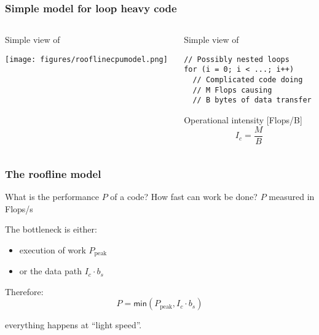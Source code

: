 \documentclass[dvipsnames,presentation,aspectratio=169,14pt]{beamer}
\begin{document}
\begin{frame}[fragile]
  \frametitle{Simple model for loop heavy code}
  \begin{columns}[t]
    \begin{column}{0.4\textwidth}
      Simple view of 
      \begin{center}
        \texttt{[image: figures/rooflinecpumodel.png]}
      \end{center}
    \end{column}
    \begin{column}{0.5\textwidth}
      Simple view of 

\begin{verbatim}
// Possibly nested loops
for (i = 0; i < ...; i++)
  // Complicated code doing
  // M Flops causing
  // B bytes of data transfer
\end{verbatim}

      \begin{block}{\small Operational intensity [Flops/B]}
        \begin{equation*}
          I_c = \frac{M}{B}
        \end{equation*}
      \end{block}
    \end{column}
  \end{columns}
\end{frame}

\begin{frame}
  \frametitle{The roofline model \hfill
    \href{https://doi.org/10.1145/1498765.1498785}{\faBook} \ \ \ }
  \begin{challenge}{What is the performance $P$ of a code?}
    How fast can work be done? $P$ measured in Flops/s
  \end{challenge}
  \pause
  \vskip 4pt
  The bottleneck is either:\\[-9pt]
  \begin{itemize}[itemsep=5pt]
  \item execution of work $P_{\text{peak}}$
  \item or the data path $I_c \cdot b_s$
  \end{itemize}
  \vskip 8pt

  Therefore:\\[-11pt]
  \begin{equation*}
    P = \mathsf{min}{(P_\text{peak}, I_c \cdot b_s)}
  \end{equation*}

  \pause
  \vskip 8pt

   everything happens at ``light speed''.

\end{frame}
\end{document}
